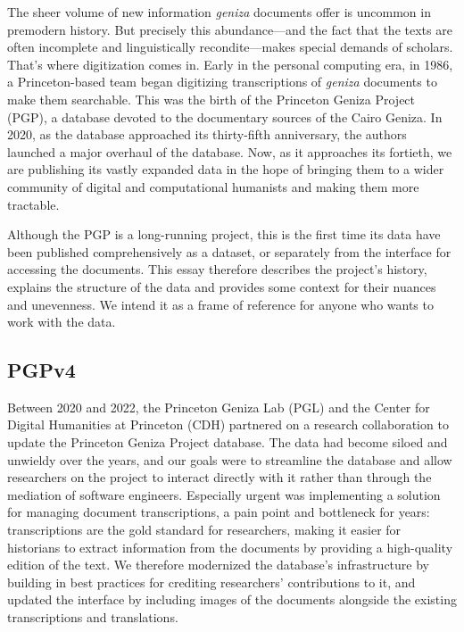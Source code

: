 \documentclass{article}
\begin{document}
The sheer volume of new information \textit{geniza} documents offer is uncommon in premodern history. But precisely this abundance—and the fact that the texts are often incomplete and linguistically recondite—makes special demands of scholars. That’s where digitization comes in. 
Early in the personal computing era, in 1986, a Princeton-based team began digitizing transcriptions of \textit{geniza} documents to make them searchable. This was the birth of the Princeton Geniza Project (PGP), a database devoted to the documentary sources of the Cairo Geniza. In 2020, as the database approached its thirty-fifth anniversary, the authors launched a major overhaul of the database. Now, as it approaches its fortieth, we are publishing its vastly expanded data in the hope of bringing them to a wider community of digital and computational humanists and making them more tractable.

Although the PGP is a long-running project, this is the first time its data have been published comprehensively as a dataset, or separately from the interface for accessing the documents. This essay therefore describes the project’s history, explains the structure of the data and provides some context for their nuances and unevenness. We intend it as a frame of reference for anyone who wants to work with the data. 

\subsection{PGPv4}

Between 2020 and 2022, the Princeton Geniza Lab (PGL) and the Center for Digital Humanities at Princeton (CDH) partnered on a research collaboration to update the Princeton Geniza Project database. The data had become siloed and unwieldy over the years, and our goals were to streamline the database and allow researchers on the project to interact directly with it rather than through the mediation of software engineers. Especially urgent was implementing a solution for managing document transcriptions, a pain point and bottleneck for years: transcriptions are the gold standard for researchers, making it easier for historians to extract information from the documents by providing a high-quality edition of the text. We therefore modernized the database’s infrastructure by building in best practices for crediting researchers’ contributions to it, and updated the interface by including images of the documents alongside the existing transcriptions and translations. 
\end{document}
